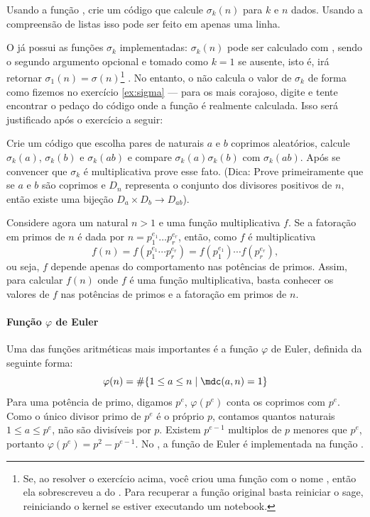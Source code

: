 \begin{exercise}  \label{ex:sigma}
  Usando a função , crie um código
  que calcule $\sigma_k(n)$ para $k$ e $n$ dados. Usando a
  compreensão de listas isso pode ser feito em apenas uma linha.
\end{exercise}  

O \sage já possui as funções $\sigma_k$ implementadas: $\sigma_k(n)$
pode ser calculado com , sendo o segundo argumento
opcional e tomado como $k=1$ se ausente, isto é, 
irá retornar $\sigma_1(n) = \sigma(n)$\footnote{Se,
ao resolver o exercício acima, você criou uma função com o nome ,
então ela sobrescreveu a do \sage. Para recuperar a função original basta
reiniciar o sage, reiniciando o kernel se estiver executando um notebook.}
. No entanto, o \sage não
calcula o valor de $\sigma_k$ de forma como fizemos no exercício
\ref{ex:sigma} --- para os mais corajoso, digite  e 
tente encontrar o pedaço do código onde a função é realmente calculada.
Isso será justificado após o exercício a seguir:

\begin{exercise}
  Crie um código que escolha pares de naturais $a$ e $b$ coprimos
  aleatórios, calcule $\sigma_k(a)$, $\sigma_k(b)$ e $\sigma_k(ab)$ e
  compare $\sigma_k(a)\sigma_k(b)$ com $\sigma_k(ab)$. Após se convencer
  que $\sigma_k$ é multiplicativa prove esse fato. (Dica: Prove primeiramente
  que se $a$ e $b$ são coprimos e $D_n$ representa o conjunto dos divisores
  positivos de $n$, então existe uma bijeção $D_{a}\times D_{b} \to D_{ab}$).
\end{exercise}


Considere agora um natural $n>1$ e uma função multiplicativa $f$. Se
a fatoração em primos de $n$ é dada por $n=p_1^{e_1} \dots p_r^{e_r}$,
então, como $f$ é multiplicativa
$$
  f(n) = f(p_1^{e_1} \cdots p_r^{e_r}) = f(p_1^{e_1}) \cdots f(p_r^{e_r}),
$$
ou seja, $f$ depende apenas do comportamento nas potências de primos.
Assim, para calcular $f(n)$ onde $f$ é uma função multiplicativa, basta
conhecer os valores de $f$ nas potências de primos e a fatoração em primos
de $n$. 

\paragraph{Função $\varphi$ de Euler}
Uma das funções aritméticas mais importantes é a função $\varphi$ de Euler,
definida da seguinte forma:
$$
  \varphi(n) = \#\{1\leq a \leq n \mid \mdc(a,n) = 1\}
$$
Para uma potência de primo, digamos $p^e$, $\varphi(p^e)$ conta
os coprimos com $p^e$. Como o único divisor primo de $p^e$  é o próprio
$p$, contamos quantos naturais $1\leq a \leq p^e$, não são divisíveis por
$p$. Existem $p^{e-1}$ multiplos de $p$ menores que $p^e$, portanto
$\varphi(p^e) = p^2 - p^{e-1}$. No \sage, a função de Euler é
implementada na função . 

